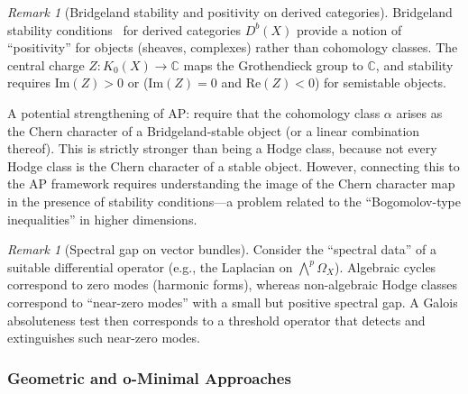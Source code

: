 \documentclass[aps,prd,twocolumn,superscriptaddress,nofootinbib]{revtex4-2}
\theoremstyle{definition}
\theoremstyle{remark}
\newtheorem{remark}[theorem]{Remark}
\begin{document}
\begin{remark}[Bridgeland stability and positivity on derived categories]
\label{rem:bridgeland}
Bridgeland stability conditions~\cite{Bridgeland2007} for derived categories $D^b(X)$ provide a notion of ``positivity'' for objects (sheaves, complexes) rather than cohomology classes. The central charge $Z: K_0(X) \to \mathbb{C}$ maps the Grothendieck group to $\mathbb{C}$, and stability requires $\mathrm{Im}(Z) > 0$ or ($\mathrm{Im}(Z) = 0$ and $\mathrm{Re}(Z) < 0$) for semistable objects.

A potential strengthening of AP: require that the cohomology class $\alpha$ arises as the Chern character of a Bridgeland-stable object (or a linear combination thereof). This is strictly stronger than being a Hodge class, because not every Hodge class is the Chern character of a stable object. However, connecting this to the AP framework requires understanding the image of the Chern character map in the presence of stability conditions---a problem related to the ``Bogomolov-type inequalities'' in higher dimensions.
\end{remark}

\begin{remark}[Spectral gap on vector bundles]
\label{rem:spectral-gap}
Consider the ``spectral data'' of a suitable differential operator (e.g., the Laplacian on $\bigwedge^p \Omega_X$). Algebraic cycles correspond to zero modes (harmonic forms), whereas non-algebraic Hodge classes correspond to ``near-zero modes'' with a small but positive spectral gap. A Galois absoluteness test then corresponds to a threshold operator that detects and extinguishes such near-zero modes.
\end{remark}


\subsubsection{Geometric and o-Minimal Approaches}
\end{document}
